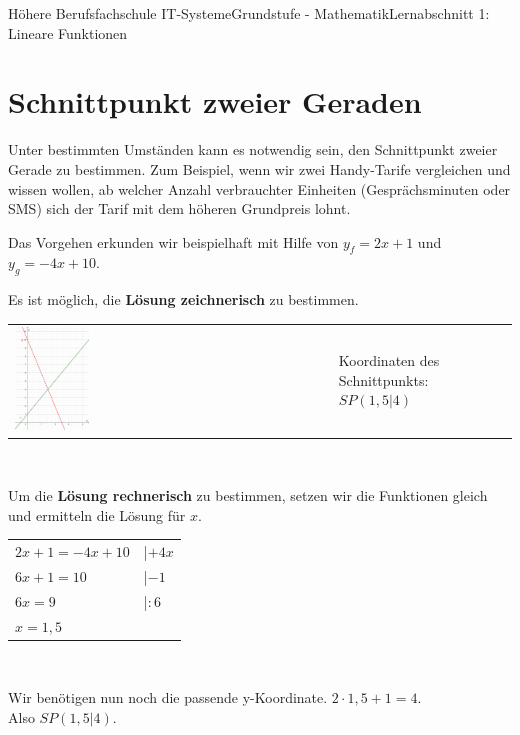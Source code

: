 \documentclass[11pt,twocolumn,oneside,openany,headings=optiontotoc,11pt,numbers=noenddot]{article}
\begin{document}
\begin{worksheet}{Höhere Berufsfachschule IT-Systeme}{Grundstufe - 
		Mathematik}{Lernabschnitt 1: Lineare Funktionen}
		\section{Schnittpunkt zweier Geraden}
		Unter bestimmten Umständen kann es notwendig sein, den Schnittpunkt zweier Gerade zu bestimmen. Zum Beispiel, wenn wir zwei Handy-Tarife vergleichen und wissen wollen, ab welcher Anzahl verbrauchter Einheiten (Gesprächsminuten oder SMS) sich der Tarif mit dem höheren Grundpreis lohnt.\\
		\par\noindent
		Das Vorgehen erkunden wir beispielhaft mit Hilfe von \(y_f=2x+1\) und \(y_g = -4x+10\).\\
		\par\noindent
		Es ist möglich, die \textbf{Lösung zeichnerisch} zu bestimmen.\\
		\begin{tabularx}{0.5\textwidth}{XX}
			\includegraphics[width=0.24\textwidth,align=t]{../99_Bilder/SzG.png} & \begin{framed}
				Koordinaten des Schnittpunkts: \(SP(1,5|4)\)
			\end{framed}
		\end{tabularx}\\
		\par\noindent
		Um die \textbf{Lösung rechnerisch} zu bestimmen, setzen wir die Funktionen gleich und ermitteln die Lösung für \(x\).\\
		\par\noindent
		\begin{tabularx}{0.48\textwidth}{ll}
			\(2x+1 = -4x+10\) & |\(+4x\)\\
			\(6x + 1 = 10\) & |\(-1\)\\
			\(6x = 9\) & |\(:6\)\\
			\(x = 1,5\)
		\end{tabularx}\\
		\par\noindent
		Wir benötigen nun noch die passende y-Koordinate. \(2\cdot{}1,5 + 1 = 4\).\\
		Also \(SP(1,5|4)\).
		\newpage

\end{worksheet}
\end{document}
